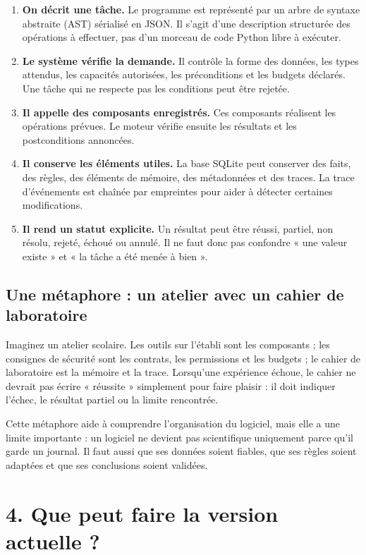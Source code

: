 \documentclass[11pt,a4paper]{article}
\begin{document}
\begin{enumerate}
  \item \textbf{On décrit une tâche.} Le programme est représenté par un arbre de syntaxe abstraite (AST) sérialisé en JSON. Il s'agit d'une description structurée des opérations à effectuer, pas d'un morceau de code Python libre à exécuter.
  \item \textbf{Le système vérifie la demande.} Il contrôle la forme des données, les types attendus, les capacités autorisées, les préconditions et les budgets déclarés. Une tâche qui ne respecte pas les conditions peut être rejetée.
  \item \textbf{Il appelle des composants enregistrés.} Ces composants réalisent les opérations prévues. Le moteur vérifie ensuite les résultats et les postconditions annoncées.
  \item \textbf{Il conserve les éléments utiles.} La base SQLite peut conserver des faits, des règles, des éléments de mémoire, des métadonnées et des traces. La trace d'événements est chaînée par empreintes pour aider à détecter certaines modifications.
  \item \textbf{Il rend un statut explicite.} Un résultat peut être réussi, partiel, non résolu, rejeté, échoué ou annulé. Il ne faut donc pas confondre « une valeur existe » et « la tâche a été menée à bien ».
\end{enumerate}

\subsection*{Une métaphore : un atelier avec un cahier de laboratoire}

Imaginez un atelier scolaire. Les outils sur l'établi sont les composants ; les consignes de sécurité sont les contrats, les permissions et les budgets ; le cahier de laboratoire est la mémoire et la trace. Lorsqu'une expérience échoue, le cahier ne devrait pas écrire « réussite » simplement pour faire plaisir : il doit indiquer l'échec, le résultat partiel ou la limite rencontrée.

Cette métaphore aide à comprendre l'organisation du logiciel, mais elle a une limite importante : un logiciel ne devient pas scientifique uniquement parce qu'il garde un journal. Il faut aussi que ses données soient fiables, que ses règles soient adaptées et que ses conclusions soient validées.

\section*{4. Que peut faire la version actuelle ?}
\end{document}
